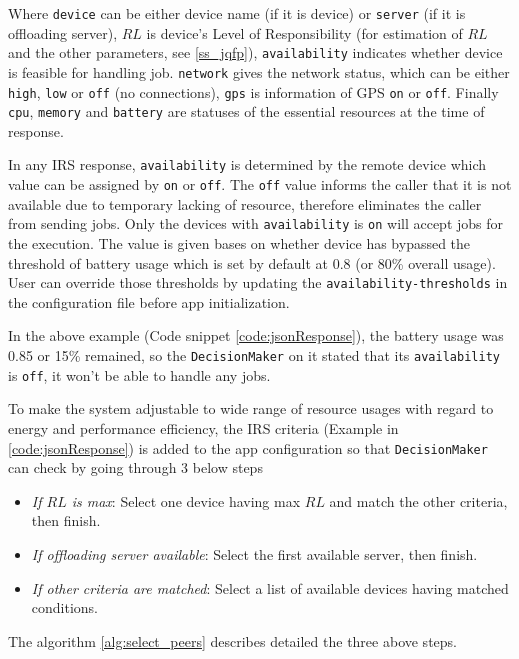 \documentclass[conference]{IEEEtran}
\begin{document}
Where \texttt{device} can be either device name (if it is device) or \texttt{server} (if it is offloading server), $RL$ is device's Level of Responsibility (for estimation of $RL$ and the other parameters, see \ref{ss_jqfp}), \texttt{availability} indicates whether device is feasible for handling job. \texttt{network} gives the network status, which can be either \texttt{high}, \texttt{low} or \texttt{off} (no connections), \texttt{gps} is information of GPS \texttt{on} or \texttt{off}. Finally \texttt{cpu}, \texttt{memory} and \texttt{battery} are statuses of the essential resources at the time of response. 

In any IRS response, \texttt{availability} is determined by the remote device which value can be assigned by \texttt{on} or \texttt{off}. The \texttt{off} value informs the caller that it is not available due to temporary lacking of resource, therefore eliminates the caller from sending jobs. Only the devices with \texttt{availability} is \texttt{on} will accept jobs for the execution. The value is given bases on whether device has bypassed the threshold of battery usage which is set by default at 0.8 (or 80\% overall usage). User can override those thresholds by updating the \texttt{availability-thresholds} in the configuration file before app initialization. 

In the above example (Code snippet \ref{code:jsonResponse}), the battery usage was 0.85 or 15\% remained, so the \texttt{DecisionMaker} on it stated that its \texttt{availability} is \texttt{off}, it won't be able to handle any jobs.

To make the system adjustable to wide range of resource usages with regard to energy and performance efficiency, the IRS criteria (Example in \ref{code:jsonResponse}) is added to the app configuration so that \texttt{DecisionMaker} can check by going through 3 below steps
\begin{itemize}
	\item \emph{If $RL$ is max}: Select one device having max $RL$ and match the other criteria, then finish.
	\item \emph{If offloading server available}: Select the first available server, then finish.
	\item \emph{If other criteria are matched}: Select a list of available devices having matched conditions.
\end{itemize}
The algorithm \ref{alg:select_peers} describes detailed the three above steps.
\end{document}
